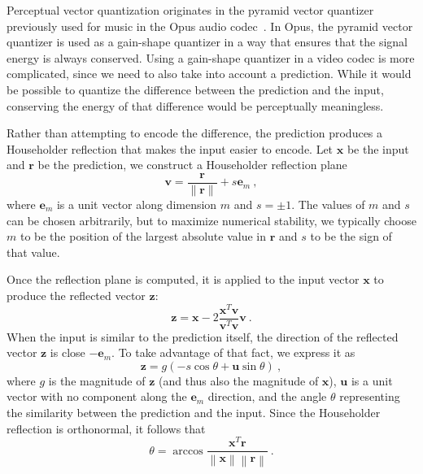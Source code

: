 \documentclass[english,conference,10pt]{IEEEtran}
\begin{document}
Perceptual vector quantization originates in the pyramid vector quantizer
previously used for music in the Opus audio codec~\cite{ValinAES}. In Opus,
the pyramid vector quantizer is used as a gain-shape quantizer in a way that
ensures that the signal energy is always conserved. Using a gain-shape
quantizer in a video codec is more complicated, since we need to also take
into account a prediction. While it would be possible to quantize the difference
between the prediction and the input, conserving the energy of that
difference would be perceptually meaningless.

Rather than attempting to encode the difference, the prediction produces
a Householder reflection that makes the input easier to encode. Let 
$\mathbf{x}$ be the input and $\mathbf{r}$ be the prediction, we construct
 a Householder reflection plane
\begin{equation}
\mathbf{v} = \frac{\mathbf{r}}{\|\mathbf{r}\|} + s\mathbf{e}_m\ ,
\end{equation}
where $\mathbf{e}_m$ is a unit vector along dimension $m$ and $s = \pm1$.
The values of $m$ and $s$ can be chosen arbitrarily, but to maximize
numerical stability, we typically choose $m$ to be the position of the
largest absolute value in $\mathbf{r}$ and $s$ to be the sign of that value.

Once the reflection plane is computed, it is applied to the input vector
$\mathbf{x}$ to produce the reflected vector $\mathbf{z}$:
\begin{equation}
\mathbf{z} = \mathbf{x} - 2\frac{\mathbf{x}^T\mathbf{v}}
{\mathbf{v}^T\mathbf{v}}\mathbf{v}\ .
\end{equation}
When the input is similar to the prediction itself, the direction of the
reflected vector $\mathbf{z}$ is close $-\mathbf{e}_m$. To take advantage of
that fact, we express it as
\begin{equation}
\mathbf{z} = g\left(-s\cos\theta + \mathbf{u}\sin\theta\right)\ ,
\end{equation}
where $g$ is the magnitude of $\mathbf{z}$ (and thus also the magnitude of
$\mathbf{x}$), $\mathbf{u}$ is a unit vector with no component along the
$\mathbf{e}_m$ direction, and the angle $\theta$ representing the
similarity between the prediction and the input. Since the Householder
reflection is orthonormal, it follows that
\begin{equation}
\theta = \arccos\frac{\mathbf{x}^T\mathbf{r}}
                   {\left\|\mathbf{x}\right\|\left\|\mathbf{r}\right\|}\ .
\end{equation}
\end{document}
